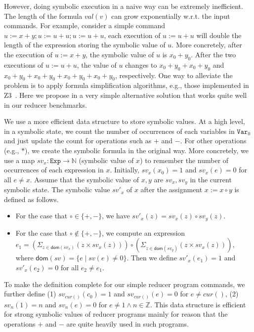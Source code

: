 \documentclass{llncs}
\newcommand{\Var}{\mathtt{Var}}
\newcommand{\Exp}{\mathtt{Exp}}
\newcommand{\cur}{cur()}
\newcommand{\dom}[1]{\mathsf{dom}(#1)}
\newcommand{\Z}{\mathbb{Z}}
\begin{document}
However, doing symbolic execution in a naive way can be extremely inefficient. 
The length of the formula $val(v)$ can grow exponentially w.r.t. the input commands. For example, consider a simple command $u:=x+y;u:=u+u;u:=u+u$, each execution of $u:= u+ u$ will double the length of the expression storing the symbolic value of $u$. More concretely, after the execution of $u:=x+y$, the symbolic value of $u$ is $x_0+y_0$. After the two executions of $u:=u+u$, the value of $u$ changes to $x_0+y_0+x_0+y_0$ and $x_0+y_0+x_0+y_0+x_0+y_0+x_0+y_0$, respectively. One way to alleviate the problem is to apply formula simplification algorithms, e.g., those implemented in Z3~\cite{z3}. 
Here we propose in a very simple alternative solution that works quite well in our reducer benchmarks.

We use a more efficient data structure to store symbolic values. At a high level, in a symbolic state, we count the number of occurrences of each variables in $\Var_0$ and just update the count for operations such as $+$ and $-$. For other operations (e.g., $*$), we create the symbolic formula in the original way.
More concretely, we use a map $sv_x:\Exp\rightarrow \mathbb{N}$ (symbolic value of $x$) to remember the number of occurrences of each expression in $x$. Initially, $sv_x(x_0) = 1$ and $sv_x (e) =0$ for all $e\neq x$. Assume that the symbolic value of $x,y$ are $sv_x,sv_y$ in the current symbolic state. The symbolic value $sv'_x$ of $x$ after the assignment $x:=x\circ y$ is defined as follows. 

\begin{itemize}
	\item For the case that $\circ \in\{+,-\}$, we have $sv'_x(z) = sv_x(z)\circ  sv_y(z)$. 
	\item For the case that $\circ \notin\{+,-\}$, we compute an expression $e_1= (\Sigma_{z\in \dom{sv_x}} (z\times sv_x(z)) )\circ (\Sigma_{z\in \dom{sv_y}} (z\times sv_x(z)))$, where $\dom{sv}=\{e\mid sv(e)\neq 0\}$. Then we define $sv'_x(e_1) =1$ and $sv'_x(e_2) = 0$ for all $e_2\neq e_1$. 
\end{itemize}
To make the definition complete for our simple reducer program commands, we further define (1) $sv_{\cur}(c_0) =1$ and $sv_{\cur}(e)=0$ for $e\neq \cur$, (2) $sv_{n}(1) =n$ and $sv_{n}(e)=0$ for $e\neq 1 \wedge n\in \Z$.
This data structure is efficient for strong symbolic values of reducer programs mainly for reason that the operations $+$ and $-$ are quite heavily used in such programs. 
\end{document}
